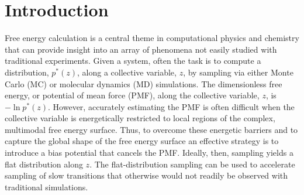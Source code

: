 \documentclass[reprint, superscriptaddress, floatfix]{revtex4-1}
\begin{document}
\section{Introduction}



Free energy calculation\cite{frenkel, newman} is a central theme
in computational physics and chemistry
that can provide insight into an array of phenomena not easily studied
with traditional experiments.
%
Given a system,
often the task is to compute
a distribution, $p^*(z)$,
along a collective variable, $z$, by sampling via either Monte Carlo\cite{
  frenkel, newman, landau_binder} (MC)
or molecular dynamics\cite{frenkel, karplus2002} (MD) simulations.
%
The dimensionless free energy, or potential of mean force (PMF),
along the collective variable, $z$,
is $-\ln p^*(z)$.
%
However, accurately estimating the PMF is often difficult
when the collective variable is energetically restricted to local regions
of the complex, multimodal free energy surface.
%
Thus,
to overcome these energetic barriers and
to capture the global shape of the free energy surface
an effective strategy is to introduce a bias potential that
cancels the PMF.
%
Ideally, then, sampling yields a flat distribution
along $z$\cite{mezei1987, berg1992, *lee1993,
wang2001, *wang2001pre,
huber1994,
*laio2002, *laio2008, *barducci2011, *sutto2012}.
%
The flat-distribution sampling can be used to accelerate
sampling of slow transitions that otherwise would not readily
be observed with traditional simulations.
%
\end{document}
